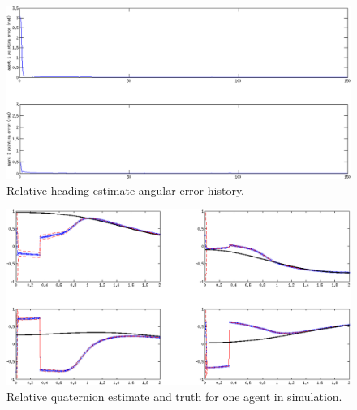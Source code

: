 \documentclass{aiaa-tc}
\begin{document}
\begin{figure}[tb!]
\centering
\includegraphics[width=1.0\textwidth]{error_history_w_omega_measured.png}
\caption{Relative heading estimate angular error history.}
\label{fig:error_history_w_omega_measured}
\end{figure}

\begin{figure}[tb!]
\centering
\includegraphics[width=1.0\textwidth]{estimate_history_w_omega_measured.png}
\caption{Relative quaternion estimate and truth for one agent in simulation.}
\label{fig:estimate_history_w_omega_measured}
\end{figure}

%

%
\end{document}
